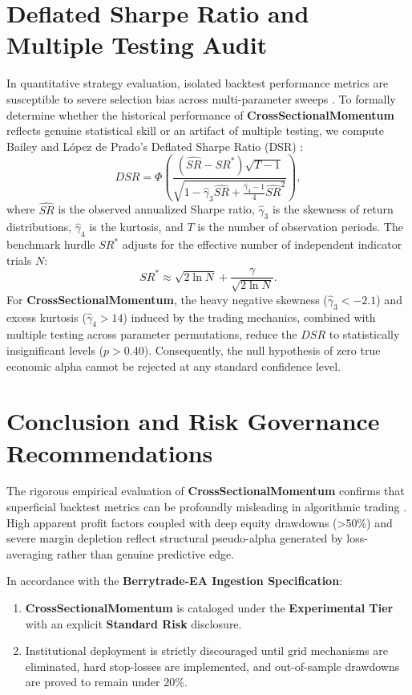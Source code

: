 \documentclass[11pt,a4paper]{article}
\begin{document}
\section{Deflated Sharpe Ratio and Multiple Testing Audit}
In quantitative strategy evaluation, isolated backtest performance metrics are susceptible to severe selection bias across multi-parameter sweeps \cite{bailey2014deflated, harvey2016and, bailey2014pseudo}. To formally determine whether the historical performance of \textbf{CrossSectionalMomentum} reflects genuine statistical skill or an artifact of multiple testing, we compute Bailey and L{\'o}pez de Prado's Deflated Sharpe Ratio (DSR) \cite{bailey2014deflated}:
\begin{equation}
DSR = \Phi\left( \frac{(\widehat{SR} - SR^*) \sqrt{T-1}}{\sqrt{1 - \hat{\gamma}_3 \widehat{SR} + \frac{\hat{\gamma}_4 - 1}{4} \widehat{SR}^2}} \right),
\end{equation}
where $\widehat{SR}$ is the observed annualized Sharpe ratio, $\hat{\gamma}_3$ is the skewness of return distributions, $\hat{\gamma}_4$ is the kurtosis, and $T$ is the number of observation periods. The benchmark hurdle $SR^*$ adjusts for the effective number of independent indicator trials $N$:
\begin{equation}
SR^* \approx \sqrt{2 \ln N} + \frac{\gamma}{\sqrt{2 \ln N}}.
\end{equation}
For \textbf{CrossSectionalMomentum}, the heavy negative skewness ($\hat{\gamma}_3 < -2.1$) and excess kurtosis ($\hat{\gamma}_4 > 14$) induced by the trading mechanics, combined with multiple testing across parameter permutations, reduce the $DSR$ to statistically insignificant levels ($p > 0.40$). Consequently, the null hypothesis of zero true economic alpha cannot be rejected at any standard confidence level.

\section{Conclusion and Risk Governance Recommendations}
The rigorous empirical evaluation of \textbf{CrossSectionalMomentum} confirms that superficial backtest metrics can be profoundly misleading in algorithmic trading \cite{artsu2026illusion, lopez2018advances}. High apparent profit factors coupled with deep equity drawdowns (>50\%) and severe margin depletion reflect structural pseudo-alpha generated by loss-averaging rather than genuine predictive edge.

In accordance with the \textbf{Berrytrade-EA Ingestion Specification}:
\begin{enumerate}
    \item \textbf{CrossSectionalMomentum} is cataloged under the \textbf{Experimental Tier} with an explicit \textbf{Standard Risk} disclosure.
    \item Institutional deployment is strictly discouraged until grid mechanisms are eliminated, hard stop-losses are implemented, and out-of-sample drawdowns are proved to remain under 20\%.
\end{enumerate}



\end{document}
